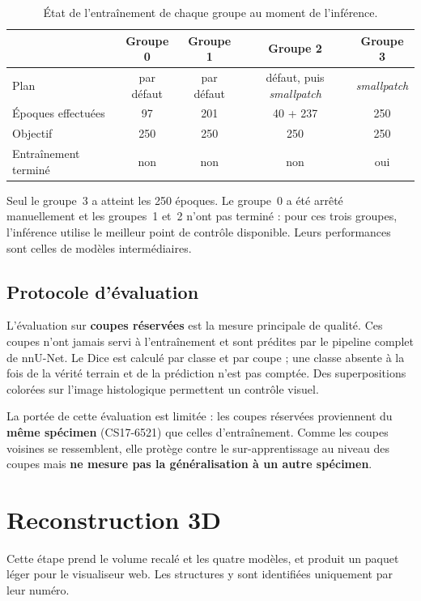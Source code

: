 \documentclass[12pt,a4paper]{report}
\begin{document}
\begin{table}[H]
\centering
\small
\begin{tabular}{lcccc}
\toprule
 & \textbf{Groupe 0} & \textbf{Groupe 1} & \textbf{Groupe 2} & \textbf{Groupe 3} \\
\midrule
Plan & par défaut & par défaut & défaut, puis \textit{smallpatch} & \textit{smallpatch} \\
Époques effectuées & 97 & 201 & 40 + 237 & 250 \\
Objectif & 250 & 250 & 250 & 250 \\
Entraînement terminé & non & non & non & oui \\
\bottomrule
\end{tabular}
\caption[Avancement de l'entraînement]{État de l'entraînement de chaque groupe au moment de l'inférence.}
\label{tab:trainstate}
\end{table}

Seul le groupe~3 a atteint les 250 époques. Le groupe~0 a été arrêté manuellement et les groupes~1 et~2 n'ont pas terminé : pour ces trois groupes, l'inférence utilise le meilleur point de contrôle disponible. Leurs performances sont celles de modèles intermédiaires.

\section{Protocole d'évaluation}

L'évaluation sur \textbf{coupes réservées} est la mesure principale de qualité. Ces coupes n'ont jamais servi à l'entraînement et sont prédites par le pipeline complet de nnU-Net. Le Dice est calculé par classe et par coupe ; une classe absente à la fois de la vérité terrain et de la prédiction n'est pas comptée. Des superpositions colorées sur l'image histologique permettent un contrôle visuel.

La portée de cette évaluation est limitée : les coupes réservées proviennent du \textbf{même spécimen} (CS17-6521) que celles d'entraînement. Comme les coupes voisines se ressemblent, elle protège contre le sur-apprentissage au niveau des coupes mais \textbf{ne mesure pas la généralisation à un autre spécimen}.

\chapter{Reconstruction 3D}\label{ch:3d}

Cette étape prend le volume recalé et les quatre modèles, et produit un paquet léger pour le visualiseur web. Les structures y sont identifiées uniquement par leur numéro.
\end{document}
